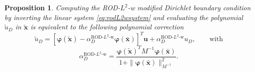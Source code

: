\documentclass{article}
\renewcommand{\phi}{\varphi}
\newtheorem{proposition}[theorem]{Proposition}%
\begin{document}
\begin{proposition}
Computing the ROD-$L^2$-w modified Dirichlet boundary condition by inverting the linear system \eqref{eq:rodL2wsystem} and evaluating the polynomial $\tilde u_D$ in $\tilde{\boldsymbol{x}}$ is equivalent to the following polynomial correction
\begin{equation}\label{eq:rodL2w_final}
    \tilde u_D = [\boldsymbol{\phi}(\tilde{\boldsymbol{x}}) - \alpha_D^{\text{ROD-$L^2$-w}} \boldsymbol{\phi}(\bar{\boldsymbol{x}})]^T \boldsymbol{u} + \alpha_D^{\text{ROD-$L^2$-w}} u_D,\quad \quad \text{with} 
\end{equation}
\begin{equation}\label{eq:alpha_rod_L2_w}
    \alpha_D^{\text{ROD-$L^2$-w}} = \frac{\boldsymbol{\phi}(\tilde{\boldsymbol{x}})^T M^{-1}\boldsymbol{\phi}(\bar{\boldsymbol{x}})}{1+\|\boldsymbol{\phi}(\bar{\boldsymbol{x}})\|^2_{M^{-1}}}.
\end{equation}
\end{proposition}
\end{document}
